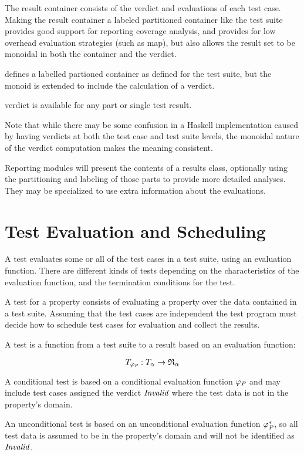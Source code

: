 The result container consists of the verdict and evaluations of each test case.
Making the result container a labeled partitioned container like the test suite
provides good support for reporting coverage analysis,
and provides for low overhead evaluation strategies (such as map),
but also allows the result set to be monoidal in both the container and the verdict.

\begin{df}
defines a labelled partioned container as defined for the test suite,
but the monoid is extended to include the calculation of a verdict.

verdict is available for any part or single test result.
\end{df}
Note that while there may be some confusion in a Haskell implementation
caused by having verdicts at both the test case and test suite levels,
the monoidal nature of the verdict computation makes the meaning consistent.

Reporting modules will present the contents of a results class,
optionally using the partitioning and labeling of those parts
to provide more detailed analyses.
They may be specialized to use extra information about the evaluations.

\section{Test Evaluation and Scheduling}

A test evaluates some or all of the test cases in a test suite,
using an evaluation function.
There are different kinds of tests depending on 
the characteristics of the evaluation function,
and the termination conditions for the test.

A test for a property consists of evaluating a property
over the data contained in a test suite.
Assuming that the test cases are independent 
the test program must decide how to schedule test cases for evaluation
and collect the results.


\begin{df}[Test]
A test is a function from a test suite to a result based on an evaluation function:

$$T_{\varphi_{\emph{P}}} : \emph{\ensuremath{T_{\alpha}}} \rightarrow \mathfrak{R}_{\alpha}$$
\end{df}


\begin{df}
A conditional test is based on a conditional evaluation function $\varphi_{\emph{P}}$ 
and may include test cases assigned the verdict $\emph{Invalid}$ where
the test data is not in the property's domain.
\end{df}
\begin{df}
An unconditional test is based on an unconditional evaluation function $\varphi^*_{\emph{P}}$, 
so all test data is assumed to be in the property's domain
and will not be identified as $\emph{Invalid}$.
\end{df}

